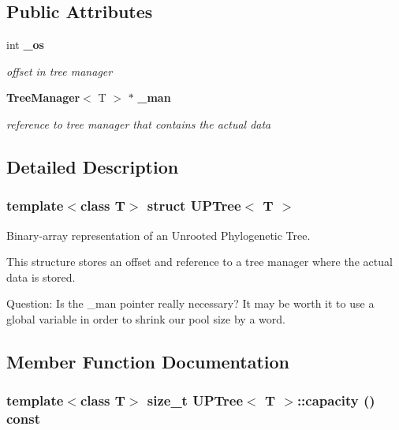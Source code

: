 \subsection*{Public Attributes}
\begin{CompactItemize}
\item 
int {\bf \_\-os}
\begin{CompactList}\small\item\em offset in tree manager \item\end{CompactList}\item 
{\bf Tree\-Manager}$<$ T $>$ $\ast$ {\bf \_\-man}
\begin{CompactList}\small\item\em reference to tree manager that contains the actual data \item\end{CompactList}\end{CompactItemize}


\subsection{Detailed Description}
\subsubsection*{template$<$class T$>$ struct UPTree$<$ T $>$}

Binary-array representation of an Unrooted Phylogenetic Tree. 

This structure stores an offset and reference to a tree manager where the actual data is stored.

Question: Is the \_\-man pointer really necessary? It may be worth it to use a global variable in order to shrink our pool size by a word. 



\subsection{Member Function Documentation}
\subsubsection{\setlength{\rightskip}{0pt plus 5cm}template$<$class T$>$ size\_\-t {\bf UPTree}$<$ T $>$::capacity () const}\label{structUPTree_a6}



